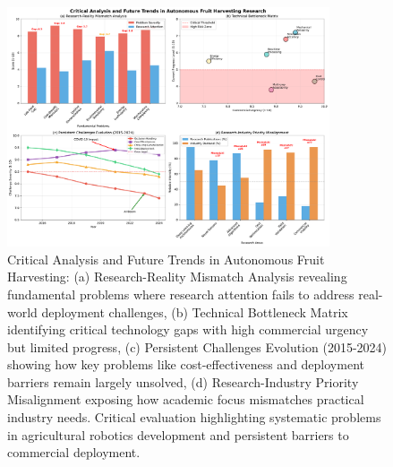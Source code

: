 \documentclass{ieeeaccess}
\begin{document}
\begin{figure}[htbp]
\centering
\includegraphics[width=0.85\textwidth]{v5_critical_analysis_fig10.pdf}
\caption{Critical Analysis and Future Trends in Autonomous Fruit Harvesting: (a) Research-Reality Mismatch Analysis revealing fundamental problems where research attention fails to address real-world deployment challenges, (b) Technical Bottleneck Matrix identifying critical technology gaps with high commercial urgency but limited progress, (c) Persistent Challenges Evolution (2015-2024) showing how key problems like cost-effectiveness and deployment barriers remain largely unsolved, (d) Research-Industry Priority Misalignment exposing how academic focus mismatches practical industry needs. Critical evaluation highlighting systematic problems in agricultural robotics development and persistent barriers to commercial deployment.}
\label{fig:future_directions_roadmap}
\end{figure}
\end{document}

